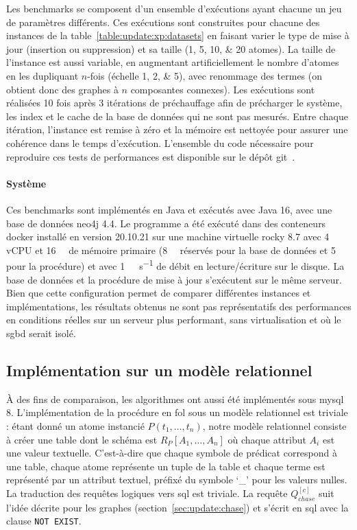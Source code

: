 Les benchmarks se composent d'un ensemble d'exécutions ayant chacune un jeu de paramètres différents.
Ces exécutions sont construites pour chacune des instances de la table~\ref{table:update:xp:datasets} en faisant varier le type de mise à jour (insertion ou suppression) et sa taille (\numlist{1;5;10;20} atomes).
La taille de l'instance est aussi variable, en augmentant artificiellement le nombre d'atomes en les dupliquant $n$-fois (échelle \numlist{1;2;5}), avec renommage des termes (on obtient donc des graphes à $n$ composantes connexes).
Les exécutions sont réalisées \num{10} fois après \num{3} itérations de préchauffage afin de précharger le système, les index et le cache de la base de données qui ne sont pas mesurés.
Entre chaque itération, l'instance est remise à zéro et la mémoire est nettoyée pour assurer une cohérence dans le temps d'exécution.
L'ensemble du code nécessaire pour reproduire ces tests de performances est disponible sur le dépôt \gls{git}~\cite{chabinUpdateChase2023}.

\paragraph{Système}
Ces benchmarks sont implémentés en Java et exécutés avec {Java 16}, avec une base de données \gls{neo4j} 4.4.
Le programme a été exécuté dans des conteneurs \gls{docker} installé en version 20.10.21 sur une machine virtuelle \gls{rocky} 8.7 avec \num{4} vCPU et \SI{16}{\giga\byte} de mémoire primaire (\SI{8}{\giga\byte} réservés pour la base de données et \SI{5}{\giga\byte} pour la procédure) et avec \SI{1}{\giga\byte\per\second} de débit en lecture/écriture sur le disque.
La base de données et la procédure de mise à jour s'exécutent sur le même serveur.
Bien que cette configuration permet de comparer différentes instances et implémentations, les résultats obtenus ne sont pas représentatifs des performances en conditions réelles sur un serveur plus performant, sans virtualisation et où le \gls{sgbd} serait isolé.

\subsection{Implémentation sur un modèle relationnel}
\label{sec:update:evaluation:mysql}
À des fins de comparaison, les algorithmes ont aussi été implémentés sous \gls{mysql} 8.
L'implémentation de la procédure en \gls{fol} sous un modèle relationnel est triviale : étant donné un atome instancié $P(t_1, \dots, t_n)$, notre modèle relationnel consiste à créer une table dont le schéma est $R_P[A_1, \dots, A_n]$ où chaque attribut $A_i$ est une valeur textuelle.
C'est-à-dire que chaque symbole de prédicat correspond à une table, chaque atome représente un tuple de la table et chaque terme est représenté par un attribut textuel, préfixé du symbole `\_' pour les valeurs nulles.
La traduction des requêtes logiques vers \gls{sql} est triviale.
La requête $Q_{chase}^{[c]}$ suit l'idée décrite pour les graphes (section~\ref{sec:update:chase}) et s'écrit en \gls{sql} avec la clause \verb|NOT EXIST|.

